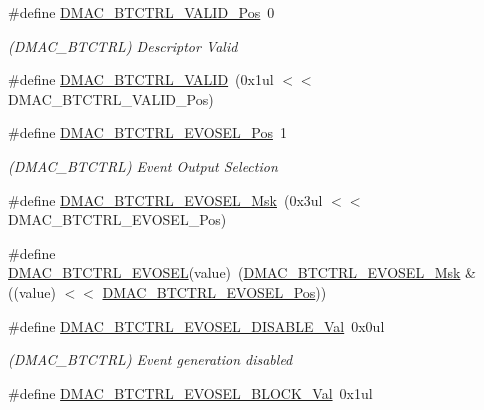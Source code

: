 \begin{DoxyCompactItemize}
\#define \mbox{\hyperlink{group___s_a_m_d21___d_m_a_c_ga33cf66814fec850c4033159ae948b74c}{D\+M\+A\+C\+\_\+\+B\+T\+C\+T\+R\+L\+\_\+\+V\+A\+L\+I\+D\+\_\+\+Pos}}~0
\begin{DoxyCompactList}\small\item\em (D\+M\+A\+C\+\_\+\+B\+T\+C\+T\+RL) Descriptor Valid \end{DoxyCompactList}\item 
\#define \mbox{\hyperlink{group___s_a_m_d21___d_m_a_c_gaa4df97835c30814df2a34adeb702edee}{D\+M\+A\+C\+\_\+\+B\+T\+C\+T\+R\+L\+\_\+\+V\+A\+L\+ID}}~(0x1ul $<$$<$ D\+M\+A\+C\+\_\+\+B\+T\+C\+T\+R\+L\+\_\+\+V\+A\+L\+I\+D\+\_\+\+Pos)
\item 
\#define \mbox{\hyperlink{group___s_a_m_d21___d_m_a_c_ga1f5b7dc4dab8086525a4bcb012d380b6}{D\+M\+A\+C\+\_\+\+B\+T\+C\+T\+R\+L\+\_\+\+E\+V\+O\+S\+E\+L\+\_\+\+Pos}}~1
\begin{DoxyCompactList}\small\item\em (D\+M\+A\+C\+\_\+\+B\+T\+C\+T\+RL) Event Output Selection \end{DoxyCompactList}\item 
\#define \mbox{\hyperlink{group___s_a_m_d21___d_m_a_c_ga98d6e69ae7dbf6d4d690459296d00ad5}{D\+M\+A\+C\+\_\+\+B\+T\+C\+T\+R\+L\+\_\+\+E\+V\+O\+S\+E\+L\+\_\+\+Msk}}~(0x3ul $<$$<$ D\+M\+A\+C\+\_\+\+B\+T\+C\+T\+R\+L\+\_\+\+E\+V\+O\+S\+E\+L\+\_\+\+Pos)
\item 
\#define \mbox{\hyperlink{group___s_a_m_d21___d_m_a_c_gac29e97d669d4797bba37a5130080193d}{D\+M\+A\+C\+\_\+\+B\+T\+C\+T\+R\+L\+\_\+\+E\+V\+O\+S\+EL}}(value)~(\mbox{\hyperlink{group___s_a_m_d21___d_m_a_c_ga98d6e69ae7dbf6d4d690459296d00ad5}{D\+M\+A\+C\+\_\+\+B\+T\+C\+T\+R\+L\+\_\+\+E\+V\+O\+S\+E\+L\+\_\+\+Msk}} \& ((value) $<$$<$ \mbox{\hyperlink{group___s_a_m_d21___d_m_a_c_ga1f5b7dc4dab8086525a4bcb012d380b6}{D\+M\+A\+C\+\_\+\+B\+T\+C\+T\+R\+L\+\_\+\+E\+V\+O\+S\+E\+L\+\_\+\+Pos}}))
\item 
\#define \mbox{\hyperlink{group___s_a_m_d21___d_m_a_c_ga3edd13f0e4d5f2626d4465cc0b3c35c1}{D\+M\+A\+C\+\_\+\+B\+T\+C\+T\+R\+L\+\_\+\+E\+V\+O\+S\+E\+L\+\_\+\+D\+I\+S\+A\+B\+L\+E\+\_\+\+Val}}~0x0ul
\begin{DoxyCompactList}\small\item\em (D\+M\+A\+C\+\_\+\+B\+T\+C\+T\+RL) Event generation disabled \end{DoxyCompactList}\item 
\#define \mbox{\hyperlink{group___s_a_m_d21___d_m_a_c_gaff2ef572cd408dffc9b02f553e35031f}{D\+M\+A\+C\+\_\+\+B\+T\+C\+T\+R\+L\+\_\+\+E\+V\+O\+S\+E\+L\+\_\+\+B\+L\+O\+C\+K\+\_\+\+Val}}~0x1ul
$$
\end{DoxyCompactItemize}
